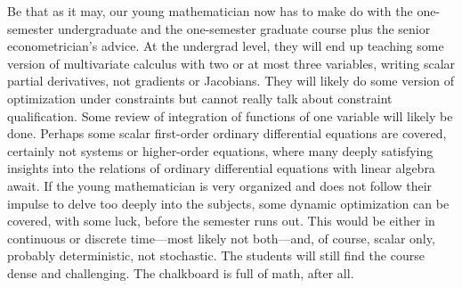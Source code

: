 \documentclass[10pt]{article}
\begin{document}
Be that as it may, our young mathematician now has to make do with the one-semester undergraduate and the one-semester graduate course plus the senior econometrician's advice. At the undergrad level, they will end up teaching some version of multivariate calculus with two or at most three variables, writing scalar partial derivatives, not gradients or Jacobians. They will likely do some version of optimization under constraints but cannot really talk about constraint qualification. Some review of integration of functions of one variable will likely be done.  Perhaps some scalar first-order ordinary differential equations are covered, certainly not systems or higher-order equations, where many deeply satisfying insights into the relations of ordinary differential equations with linear algebra await. If the young mathematician is very organized and does not follow their impulse to delve too deeply into the subjects, some dynamic optimization can be covered, with some luck, before the semester runs out. This would be either in continuous or discrete time---most likely not both---and, of course, scalar only, probably deterministic, not stochastic. The students will still find the course dense and challenging. The chalkboard is full of math, after all. 
\end{document}
